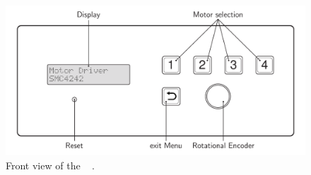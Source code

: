\begin{figure}[h]
  \centering
  \includegraphics[width=12cm]{grafiken/SMCxxx2-0006_3_daub_text.pdf}
  \caption[Front view of the \productNumber ~\productName.]{Front view of
  the \productNumber ~    \productName.}
  \label{frontpanel}
\end{figure}






